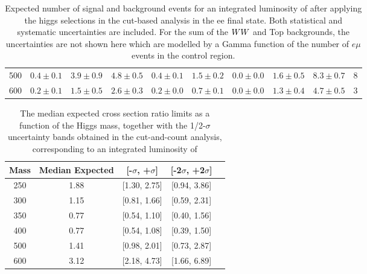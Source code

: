 \begin{table}[!ht]
{\begin{center}
\begin{tabular}{l | c c |  c c c c c c | c }
500 & $0.4\pm0.1$ & $3.9\pm0.9$ & $4.8\pm0.5$ & $0.4\pm0.1$ & $1.5\pm0.2$ & $0.0\pm0.0$ & $1.6\pm0.5$ & $8.3\pm0.7$ & 8 \\
600 & $0.2\pm0.1$ & $1.5\pm0.5$ & $2.6\pm0.3$ & $0.2\pm0.0$ & $0.7\pm0.1$ & $0.0\pm0.0$ & $1.3\pm0.4$ & $4.7\pm0.5$ & 3 \\
\hline\hline
\end{tabular}
\end{center}
}
\caption{Expected number of signal and background events for an integrated luminosity of \intlumi after applying the higgs selections 
  in the cut-based analysis in the ee final state. Both statistical and systematic uncertainties are included. For the sum of the $WW$ and Top backgrounds, the uncertainties are 
  not shown here which are modelled by a Gamma function of the number of $e\mu$ events in the control region.  }
\label{tab:yield_cutbased}
\end{table}

\begin{table}[!ht]
\begin{center}
\begin{tabular}{ccccc}
\hline\hline
Mass & Median Expected & [-$\sigma$, +$\sigma$] & [-2$\sigma$, +2$\sigma$]\\\hline
250 & 1.88 & [1.30, 2.75] & [0.94, 3.86] \\
300 & 1.15 & [0.81, 1.66] & [0.59, 2.31] \\
350 & 0.77 & [0.54, 1.10] & [0.40, 1.56] \\
400 & 0.77 & [0.54, 1.08] & [0.39, 1.50] \\
500 & 1.41 & [0.98, 2.01] & [0.73, 2.87] \\
600 & 3.12 & [2.18, 4.73] & [1.66, 6.89] \\
\hline\hline
\end{tabular}
\end{center}
\caption{The median expected cross section ratio limits as a function 
of the Higgs mass, together with the 1/2-$\sigma$ uncertainty bands obtained in the cut-and-count analysis, corresponding to 
an integrated luminosity of \intlumi}
\label{tab:limits_cutbased_4fb}
\end{table}
\clearpage
